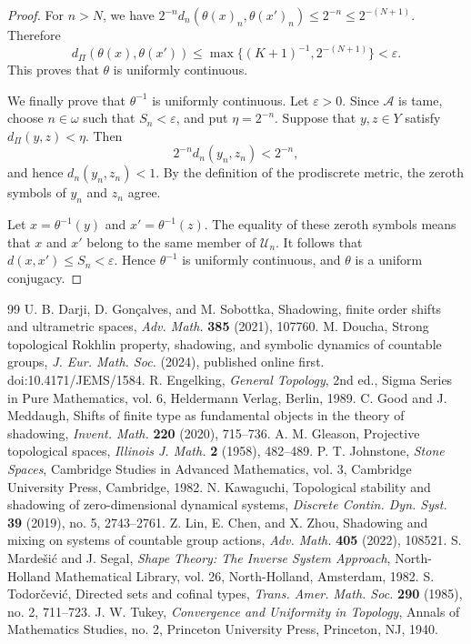 \documentclass[10pt,a4paper]{amsart}
\numberwithin{equation}{section}
\begin{document}
\begin{proof}
For $n>N$, we have
$2^{-n}d_n(\theta(x)_n,\theta(x')_n)\leq 2^{-n}\leq 2^{-(N+1)}$.
Therefore
\[
d_{\Pi}(\theta(x),\theta(x'))
\leq
\max\{(K+1)^{-1},2^{-(N+1)}\}
<\varepsilon.
\]
This proves that $\theta$ is uniformly continuous.

We finally prove that $\theta^{-1}$ is uniformly continuous. Let
$\varepsilon>0$. Since $\mathcal A$ is tame, choose $n\in\omega$ such
that $S_n<\varepsilon$, and put $\eta=2^{-n}$. Suppose that
$y,z\in Y$ satisfy $d_{\Pi}(y,z)<\eta$. Then
\[
2^{-n}d_n(y_n,z_n)<2^{-n},
\]
and hence $d_n(y_n,z_n)<1$. By the definition of the prodiscrete metric,
the zeroth symbols of $y_n$ and $z_n$ agree.

Let $x=\theta^{-1}(y)$ and $x'=\theta^{-1}(z)$. The equality of these
zeroth symbols means that $x$ and $x'$ belong to the same member of
$\mathcal U_n$. It follows that
$d(x,x')\leq S_n<\varepsilon$. Hence $\theta^{-1}$ is uniformly continuous,
and $\theta$ is a uniform conjugacy.
\end{proof}


\begin{thebibliography}{99}
 U. B. Darji, D. Gon\c{c}alves, and M. Sobottka, \newblock Shadowing, finite order shifts and ultrametric spaces, \newblock \emph{Adv. Math.} \textbf{385} (2021), 107760.
 M. Doucha, \newblock Strong topological Rokhlin property, shadowing, and symbolic dynamics of countable groups, \newblock \emph{J. Eur. Math. Soc.} (2024), published online first. \newblock doi:10.4171/JEMS/1584.
 R. Engelking, \newblock \emph{General Topology}, \newblock 2nd ed., Sigma Series in Pure Mathematics, vol. 6, Heldermann Verlag, Berlin, 1989.
 C. Good and J. Meddaugh, \newblock Shifts of finite type as fundamental objects in the theory of shadowing, \newblock \emph{Invent. Math.} \textbf{220} (2020), 715--736.
 A. M. Gleason, \newblock Projective topological spaces, \newblock \emph{Illinois J. Math.} \textbf{2} (1958), 482--489.
 P. T. Johnstone, \newblock \emph{Stone Spaces}, \newblock Cambridge Studies in Advanced Mathematics, vol. 3, Cambridge University Press, Cambridge, 1982.
 N. Kawaguchi, \newblock Topological stability and shadowing of zero-dimensional dynamical systems, \newblock \emph{Discrete Contin. Dyn. Syst.} \textbf{39} (2019), no. 5, 2743--2761.
 Z. Lin, E. Chen, and X. Zhou, \newblock Shadowing and mixing on systems of countable group actions, \newblock \emph{Adv. Math.} \textbf{405} (2022), 108521.
 S. Marde\v{s}i\'c and J. Segal, \newblock \emph{Shape Theory: The Inverse System Approach}, \newblock North-Holland Mathematical Library, vol. 26, North-Holland, Amsterdam, 1982.
 S. Todor\v{c}evi\'c, \newblock Directed sets and cofinal types, \newblock \emph{Trans. Amer. Math. Soc.} \textbf{290} (1985), no. 2, 711--723.
 J. W. Tukey, \newblock \emph{Convergence and Uniformity in Topology}, \newblock Annals of Mathematics Studies, no. 2, Princeton University Press, Princeton, NJ, 1940.
\end{thebibliography}
\end{document}
